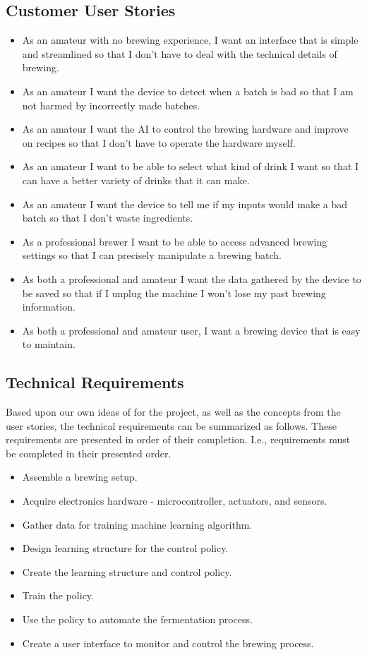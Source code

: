 \documentclass[draftclsnofoot,onecolumn,letterpaper,10pt]{IEEEtran}
\begin{document}
\subsection{Customer User Stories}
\begin{itemize}
	\item As an amateur with no brewing experience, I want an interface that is simple and streamlined so that I don't have to deal with the technical details of brewing.
	\item As an amateur I want the device to detect when a batch is bad so that I am not harmed by incorrectly made batches.
	\item As an amateur I want the AI to control the brewing hardware and improve on recipes so that I don't have to operate the hardware myself.
	\item As an amateur I want to be able to select what kind of drink I want so that I can have a better variety of drinks that it can make.
	\item As an amateur I want the device to tell me if my inputs would make a bad batch so that I don't waste ingredients.
	\item As a professional brewer I want to be able to access advanced brewing settings so that I can precisely manipulate a brewing batch.
	\item As both a professional and amateur I want the data gathered by the device to be saved so that if I unplug the machine I won't lose my past brewing information.
	\item As both a professional and amateur user, I want a brewing device that is easy to maintain.
\end{itemize}
\subsection{Technical Requirements}
Based upon our own ideas of for the project, as well as the concepts from the user stories, the technical requirements can be summarized as follows.
These requirements are presented in order of their completion.
I.e., requirements must be completed in their presented order.
\begin{itemize}
	\item Assemble a brewing setup.
	\item Acquire electronics hardware - microcontroller, actuators, and sensors.
	\item Gather data for training machine learning algorithm.
	\item Design learning structure for the control policy.
	\item Create the learning structure and control policy.
	\item Train the policy.
	\item Use the policy to automate the fermentation process.
	\item Create a user interface to monitor and control the brewing process.
\end{itemize}
\end{document}
